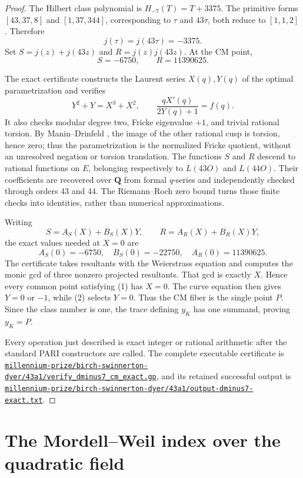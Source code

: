 \documentclass[11pt]{article}
\newcommand{\Q}{\mathbf Q}
\newcommand{\artifact}[1]{\href{run:../#1}{\nolinkurl{#1}}}
\begin{document}
\begin{proof}
The Hilbert class polynomial is \(H_{-7}(T)=T+3375\).  The primitive forms
\([43,37,8]\) and \([1,37,344]\), corresponding to \(\tau\) and
\(43\tau\), both reduce to \([1,1,2]\).  Therefore
\[
 j(\tau)=j(43\tau)=-3375.
\]
Set \(S=j(z)+j(43z)\) and \(R=j(z)j(43z)\).  At the CM point,
\[
 S=-6750,
 \qquad R=11390625.                                      \tag{1}
\]

The exact certificate constructs the Laurent series \(X(q),Y(q)\) of the
optimal parametrization and verifies
\[
 Y^2+Y=X^3+X^2,
 \qquad \frac{qX'(q)}{2Y(q)+1}=f(q).
\]
It also checks modular degree two, Fricke eigenvalue \(+1\), and trivial
rational torsion.  By Manin--Drinfeld \cite{Manin}, the image of the other
rational cusp is torsion, hence zero; thus the parametrization is the
normalized Fricke quotient, without an unresolved negation or torsion
translation.  The functions \(S\)
and \(R\) descend to rational functions on \(E\), belonging respectively to
\(L(43O)\) and \(L(44O)\).  Their coefficients are recovered over \(\Q\) from
formal \(q\)-series and independently checked through orders 43 and 44.  The
Riemann--Roch zero bound turns those finite checks into identities, rather than
numerical approximations.

Writing
\[
 S=A_S(X)+B_S(X)Y,
 \qquad R=A_R(X)+B_R(X)Y,
\]
the exact values needed at \(X=0\) are
\[
 A_S(0)=-6750,
 \quad B_S(0)=-22750,
 \quad A_R(0)=11390625.                                  \tag{2}
\]
The certificate takes resultants with the Weierstrass equation and computes
the monic gcd of three nonzero projected resultants.  That gcd is exactly
\(X\).  Hence every common point satisfying (1) has \(X=0\).  The curve
equation then gives \(Y=0\) or \(-1\), while (2) selects \(Y=0\).  Thus the
CM fiber is the single point \(P\).  Since the class number is one, the trace
defining \(y_K\) has one summand, proving \(y_K=P\).

Every operation just described is exact integer or rational arithmetic after
the standard PARI constructors are called.  The complete executable
certificate is
\artifact{millennium-prize/birch-swinnerton-dyer/43a1/verify_dminus7_cm_exact.gp},
and its retained successful output is
\artifact{millennium-prize/birch-swinnerton-dyer/43a1/output-dminus7-exact.txt}.
\end{proof}

\section{The Mordell--Weil index over the quadratic field}
\end{document}
